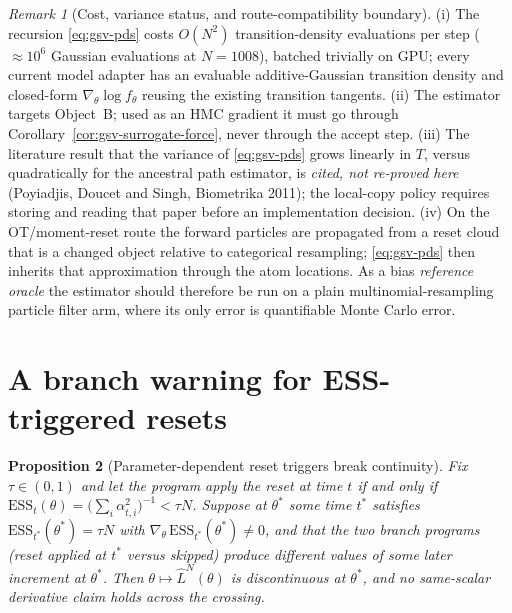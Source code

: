 \documentclass[11pt]{article}
\newtheorem{proposition}{Proposition}[section]
\theoremstyle{definition}
\theoremstyle{remark}
\newtheorem{remark}[proposition]{Remark}
\begin{document}
\begin{remark}[Cost, variance status, and route-compatibility boundary]
\label{rem:gsv-pds-boundary}
(i) The recursion \eqref{eq:gsv-pds} costs $O(N^{2})$ transition-density
evaluations per step ($\approx10^{6}$ Gaussian evaluations at $N=1008$),
batched trivially on GPU; every current model adapter has an evaluable
additive-Gaussian transition density and closed-form
$\nabla_\theta\log f_\theta$ reusing the existing transition tangents.
(ii) The estimator targets Object~B; used as an HMC gradient it must go
through Corollary~\ref{cor:gsv-surrogate-force}, never through the accept
step.  (iii) The literature result that the variance of \eqref{eq:gsv-pds}
grows linearly in $T$, versus quadratically for the ancestral path
estimator, is \emph{cited, not re-proved here} (Poyiadjis, Doucet and Singh,
Biometrika 2011); the local-copy policy requires storing and reading that
paper before an implementation decision.  (iv) On the OT/moment-reset route
the forward particles are propagated from a reset cloud that is a changed
object relative to categorical resampling; \eqref{eq:gsv-pds} then inherits
that approximation through the atom locations.  As a bias \emph{reference
oracle} the estimator should therefore be run on a plain
multinomial-resampling particle filter arm, where its only error is
quantifiable Monte Carlo error.
\end{remark}

\section{A branch warning for ESS-triggered resets}
\label{sec:gsv-branch}

\begin{proposition}[Parameter-dependent reset triggers break continuity]
\label{prop:gsv-ess-branch}
Fix $\tau\in(0,1)$ and let the program apply the reset at time $t$ if and
only if $\mathrm{ESS}_t(\theta)=\big(\sum_i\alpha_{t,i}^{2}\big)^{-1}<\tau N$.
Suppose at $\theta^{*}$ some time $t^{*}$ satisfies
$\mathrm{ESS}_{t^{*}}(\theta^{*})=\tau N$ with
$\nabla_\theta\,\mathrm{ESS}_{t^{*}}(\theta^{*})\neq0$, and that the two
branch programs (reset applied at $t^{*}$ versus skipped) produce different
values of some later increment at $\theta^{*}$.  Then
$\theta\mapsto\widehat L^{N}(\theta)$ is discontinuous at $\theta^{*}$, and
no same-scalar derivative claim holds across the crossing.
\end{proposition}
\end{document}
